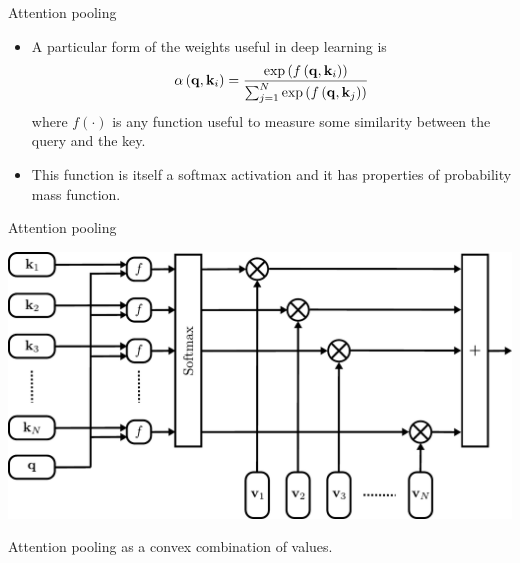 \documentclass{beamer}
\begin{document}
\begin{frame}{Attention pooling}
    \begin{itemize}
        \item A particular form of the weights useful in deep learning is
        \begin{equation}
            \alpha\left({\bf q},{\bf k}_i\right) = \frac{\exp\left(f\left( {\bf q}, {\bf k}_i \right)\right)}{\sum_{j=1}^N \exp\left(f\left( {\bf q}, {\bf k}_j \right)\right)}
        \end{equation}
where $f(\cdot)$ is any function useful to measure some similarity between the query and the key.  
\item This function is itself a softmax activation and it has properties of probability mass function. 
\end{itemize}
\end{frame}

\begin{frame}{Attention pooling}
\begin{center}
\includegraphics[scale=0.4]{Module 6 (Attention-based networks)/pics/attention.pdf}

Attention pooling as a convex combination of values.
\end{center} 
\end{frame}
\end{document}

